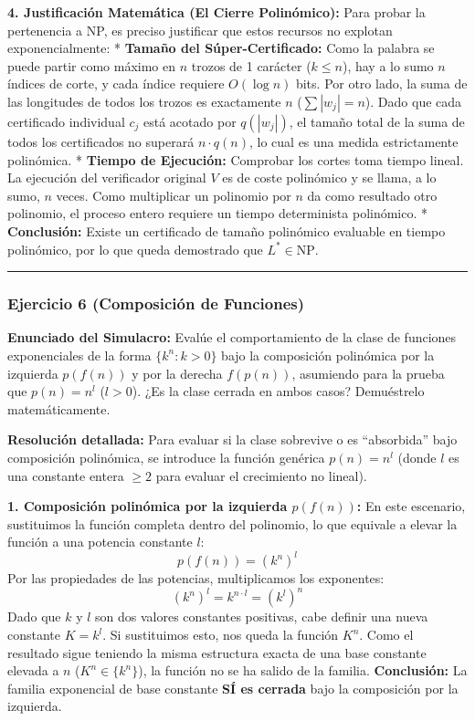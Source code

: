\documentclass[12pt]{book} %
\begin{document}
\textbf{4. Justificación Matemática (El Cierre Polinómico):} Para probar
la pertenencia a NP, es preciso justificar que estos recursos no
explotan exponencialmente: * \textbf{Tamaño del Súper-Certificado:} Como
la palabra se puede partir como máximo en \(n\) trozos de 1 carácter
(\(k \le n\)), hay a lo sumo \(n\) índices de corte, y cada índice
requiere \(O(\log n)\) bits. Por otro lado, la suma de las longitudes de
todos los trozos es exactamente \(n\) (\(\sum |w_j| = n\)). Dado que
cada certificado individual \(c_j\) está acotado por \(q(|w_j|)\), el
tamaño total de la suma de todos los certificados no superará
\(n \cdot q(n)\), lo cual es una medida estrictamente polinómica. *
\textbf{Tiempo de Ejecución:} Comprobar los cortes toma tiempo lineal.
La ejecución del verificador original \(V\) es de coste polinómico y se
llama, a lo sumo, \(n\) veces. Como multiplicar un polinomio por \(n\)
da como resultado otro polinomio, el proceso entero requiere un tiempo
determinista polinómico. * \textbf{Conclusión:} Existe un certificado de
tamaño polinómico evaluable en tiempo polinómico, por lo que queda
demostrado que \textbf{\(L^* \in \text{NP}\)}.

\begin{center}\rule{0.5\linewidth}{0.5pt}\end{center}

\hypertarget{ejercicio-6-composiciuxf3n-de-funciones}{%
\subsubsection{Ejercicio 6 (Composición de
Funciones)}\label{ejercicio-6-composiciuxf3n-de-funciones}}

\textbf{Enunciado del Simulacro:} Evalúe el comportamiento de la clase
de funciones exponenciales de la forma \(\{k^n : k > 0\}\) bajo la
composición polinómica por la izquierda \(p(f(n))\) y por la derecha
\(f(p(n))\), asumiendo para la prueba que \(p(n) = n^l\) (\(l>0\)). ¿Es
la clase cerrada en ambos casos? Demuéstrelo matemáticamente.

\textbf{Resolución detallada:} Para evaluar si la clase sobrevive o es
``absorbida'' bajo composición polinómica, se introduce la función
genérica \(p(n) = n^l\) (donde \(l\) es una constante entera \(\ge 2\)
para evaluar el crecimiento no lineal).

\textbf{1. Composición polinómica por la izquierda \(p(f(n))\):} En este
escenario, sustituimos la función completa dentro del polinomio, lo que
equivale a elevar la función a una potencia constante \(l\):
\[p(f(n)) = (k^n)^l\] Por las propiedades de las potencias,
multiplicamos los exponentes: \[(k^n)^l = k^{n \cdot l} = (k^l)^n\] Dado
que \(k\) y \(l\) son dos valores constantes positivas, cabe definir una
nueva constante \(K = k^l\). Si sustituimos esto, nos queda la función
\(K^n\). Como el resultado sigue teniendo la misma estructura exacta de
una base constante elevada a \(n\) (\(K^n \in \{k^n\}\)), la función no
se ha salido de la familia. \textbf{Conclusión:} La familia exponencial
de base constante \textbf{SÍ es cerrada} bajo la composición por la
izquierda.
\end{document}
